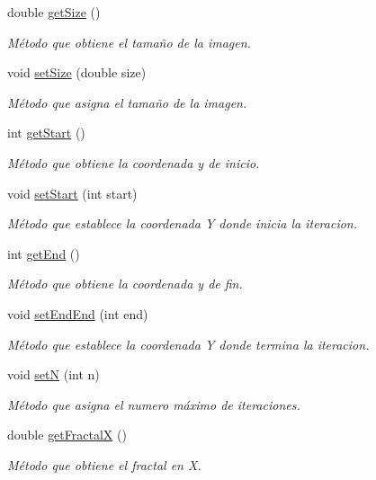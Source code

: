 \begin{DoxyCompactItemize}
double \hyperlink{class_data_a11f7bb2696a75bd529c384c8da242712}{get\+Size} ()
\begin{DoxyCompactList}\small\item\em Método que obtiene el tamaño de la imagen. \end{DoxyCompactList}\item 
void \hyperlink{class_data_a62cd79c3162b0695c7c37aabdb5566c6}{set\+Size} (double size)
\begin{DoxyCompactList}\small\item\em Método que asigna el tamaño de la imagen. \end{DoxyCompactList}\item 
int \hyperlink{class_data_a8f46b607e7967639d1ab96d429e4460c}{get\+Start} ()
\begin{DoxyCompactList}\small\item\em Método que obtiene la coordenada y de inicio. \end{DoxyCompactList}\item 
void \hyperlink{class_data_ad50db9eb7b9adc71e784ab67f9667efd}{set\+Start} (int start)
\begin{DoxyCompactList}\small\item\em Método que establece la coordenada Y donde inicia la iteracion. \end{DoxyCompactList}\item 
int \hyperlink{class_data_a98ee8be55a1ad0c2770ea852a19d738a}{get\+End} ()
\begin{DoxyCompactList}\small\item\em Método que obtiene la coordenada y de fin. \end{DoxyCompactList}\item 
void \hyperlink{class_data_a3dafc712a106610b47b89f76fff084e9}{set\+End\+End} (int end)
\begin{DoxyCompactList}\small\item\em Método que establece la coordenada Y donde termina la iteracion. \end{DoxyCompactList}\item 
void \hyperlink{class_data_a88f29c95fff497468476aa37093500fe}{set\+N} (int n)
\begin{DoxyCompactList}\small\item\em Método que asigna el numero máximo de iteraciones. \end{DoxyCompactList}\item 
double \hyperlink{class_data_ad5f6a3af2cf42e9ec692eeb46ec488c8}{get\+Fractal\+X} ()
\begin{DoxyCompactList}\small\item\em Método que obtiene el fractal en X. \end{DoxyCompactList}\item 

\end{DoxyCompactItemize}

